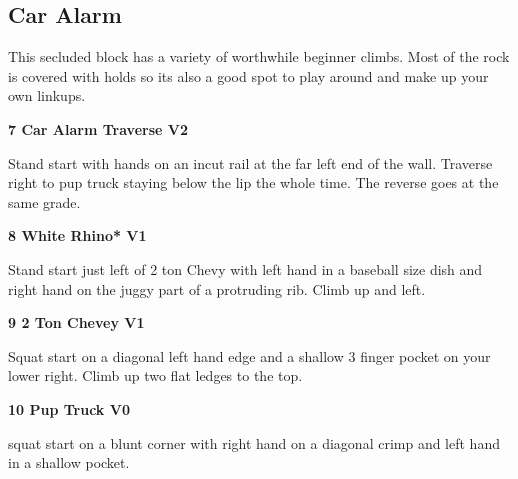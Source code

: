 	\begin{multicols}{2}


\needspace{1.5cm}
\subsection*{Car Alarm}\label{bf:Car Alarm}
This secluded block has a variety of worthwhile beginner climbs. Most of the rock is covered with holds so its also a good spot to play around and make up your own linkups.\\
	


\needspace{1.5cm}
\label{rt:Car Alarm Traverse}
\colorbox{green!20}{
\parbox{0.95\linewidth}{
\textbf{
7 Car Alarm Traverse V2  
}}}

\begin{adjustwidth}{0.5cm}{}			
Stand start with hands on an incut rail at the far left end of the wall. Traverse right to pup truck staying below the lip the whole time. The reverse goes at the same grade.
\end{adjustwidth}



\needspace{1.5cm}
\label{rt:White Rhino}
\colorbox{green!20}{
\parbox{0.95\linewidth}{
\textbf{
8 White Rhino* V1  
}}}

\begin{adjustwidth}{0.5cm}{}			
Stand start just left of 2 ton Chevy with left hand in a baseball size dish and right hand on the juggy part of a protruding rib. Climb up and left.
\end{adjustwidth}



\needspace{1.5cm}
\label{rt:2 Ton Chevey}
\colorbox{green!20}{
\parbox{0.95\linewidth}{
\textbf{
9 2 Ton Chevey V1  
}}}

\begin{adjustwidth}{0.5cm}{}			
Squat start on a diagonal left hand edge and a shallow 3 finger pocket on your lower right. Climb up two flat ledges to the top.
\end{adjustwidth}



\needspace{1.5cm}
\label{rt:Pup Truck}
\colorbox{green!20}{
\parbox{0.95\linewidth}{
\textbf{
10 Pup Truck V0  
}}}

\begin{adjustwidth}{0.5cm}{}			
squat start on a blunt corner with right hand on a diagonal crimp and left hand in a shallow pocket.
\end{adjustwidth}



\end{multicols}
